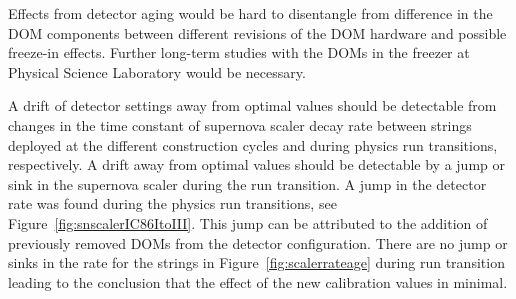 Effects from detector aging would be hard to disentangle from difference in the DOM components between different revisions of the DOM hardware and possible freeze-in effects. Further long-term studies with the DOMs in the freezer at Physical Science Laboratory would be necessary.

A drift of detector settings away from optimal values should be detectable from changes in the time constant of supernova scaler decay rate between strings deployed at the different construction cycles and during physics run transitions, respectively. A drift away from optimal values should be detectable by a jump or sink in the supernova scaler during the run transition. A jump in the detector rate was found during the physics run transitions, see Figure~\ref{fig:snscalerIC86ItoIII}. This jump can be attributed to the addition of previously removed DOMs from the detector configuration. There are no jump or sinks in the rate for the strings in Figure~\ref{fig:scalerrateage} during run transition leading to the conclusion that the effect of the new calibration values in minimal. 


